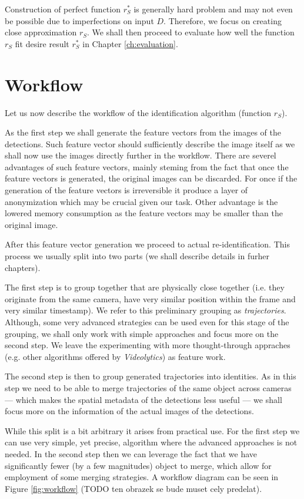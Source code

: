Construction of perfect function $r_S^*$ is generally hard problem and may not even
be possible due to imperfections on input $D$. Therefore, we focus on creating
close approximation $r_S$. We shall then proceed to evaluate how well the function
$r_S$ fit desire result $r_S^*$ in Chapter \ref{ch:evaluation}.

\section{Workflow}

Let us now describe the workflow of the identification algorithm (function $r_S$).

As the first step we shall generate the feature vectors from the images of the detections. Such
feature vector should sufficiently describe the image itself as we shall now use the images directly
further in the workflow. There are severel advantages of such feature vectors, mainly steming from the
fact that once the feature vectors is generated, the original images can be discarded. For once if the
generation of the feature vectors is irreversible it produce a layer of anonymization which may be
crucial given our task. Other advantage is the lowered memory consumption as the feature vectors may
be smaller than the original image.

After this feature vector generation we proceed to actual re-identification. This process we usually
split into two parts (we shall describe details in furher chapters).

The first step is to group together that are physically close together (i.e. they originate from
the same camera, have very similar position within the frame and very similar timestamp). We refer
to this preliminary grouping as \emph{trajectories}. Although, some very advanced strategies can
be used even for this stage of the grouping, we shall only work with simple approaches and focus
more on the second step. We leave the experimenting with more thought-through appraches (e.g.
other algorithms offered by \emph{Videolytics}) as feature work.

The second step is then to group generated trajectories into identities. As in this step we need
to be able to merge trajectories of the same object across cameras --- which makes the spatial
metadata of the detections less useful --- we shall focus more on the information of the actual
images of the detections.

While this split is a bit arbitrary it arises from practical use. For the first step we can use
very simple, yet precise, algorithm where the advanced approaches is not needed. In the second
step then we can leverage the fact that we have significantly fewer (by a few magnitudes) object
to merge, which allow for employment of some merging strategies. A workflow diagram can be seen
in Figure \ref{fig:workflow} (TODO ten obrazek se bude muset cely predelat).

